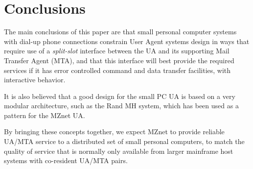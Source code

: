 \section*	{Conclusions}
The main conclusions of this paper are that 
small personal computer systems 
with dial-up phone connections constrain User Agent systems design
in ways that require use of a {\it split-slot} interface between
the UA and its supporting Mail Transfer Agent (MTA), and that
this interface will best provide the required services if it
has error controlled command and data transfer facilities, with 
interactive behavior.

It is also believed that a good design for the small PC UA
is based on a very modular architecture, such as the Rand MH
system, which has been used as a pattern for the MZnet UA.

By bringing these concepts together,
we expect MZnet to provide reliable UA/MTA
service to a distributed set of small personal computers, to match
the quality of service that is normally only available from larger
mainframe host systems with co-resident UA/MTA pairs.




